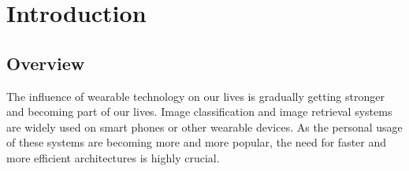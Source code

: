 
\lhead[\chaptername~\thechapter]{\rightmark}

\rhead[\leftmark]{}

\lfoot[\thepage]{}

\cfoot{}

\rfoot[]{\thepage}

\chapter{Introduction}\label{introduction}

\section{Overview}






The influence of wearable technology on our lives is gradually getting stronger and becoming part of our lives. 
Image classification and image retrieval systems are widely used on smart phones or other wearable devices.
As the personal usage of these systems are becoming more and more popular, the need for faster and more efficient architectures is highly crucial.

